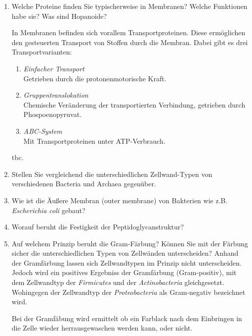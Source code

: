 \begin{enumerate}
		\item Welche Proteine finden Sie typischerweise in Membranen? Welche Funktionen habe sie? Was sind Hopanoide?
			
			In Membranen befinden sich vorallem Transportproteinen.
			Diese ermöglichen den gesteuerten Transport von Stoffen durch die Membran.
			Dabei gibt es drei Transportvarianten:
			\begin{enumerate}[label=\arabic*)]
				\item \emph{Einfacher Transport} \hfill \\ 
					Getrieben durch die protonenmotorische Kraft.
				\item \emph{Gruppentranslokation} \hfill \\ 
					Chemische Veränderung der transportierten Verbindung,
					getrieben durch Phospoenopyruvat.
				\item \emph{ABC-System} \hfill \\ 
					Mit Transportproteinen unter ATP-Verbrauch.
			\end{enumerate}

			tbc.

		\item Stellen Sie vergleichend die unterschiedlichen Zellwand-Typen von verschiedenen Bacteria und Archaea gegenüber.
		\item Wie ist die Äußere Membran (outer membrane) von Bakterien wie z.B. \emph{Escherichia coli} gebaut?
		\item Worauf beruht die Festigkeit der Peptidoglycanstruktur? 
		\item Auf welchem Prinzip beruht die Gram-Färbung? Können Sie mit der Färbung sicher die unterschiedlichen Typen von Zellwänden unterscheiden?
			Anhand der Gramfärbung lassen sich Zellwandtypen im Prinzip nicht unterscheiden.
			Jedoch wird ein positives Ergebniss der Gramfärbung (Gram-positiv),
			mit dem Zellwandtyp der \emph{Firmicutes} und der \emph{Actinobacteria} gleichgesetzt.
			Wohingegen der Zellwandtyp der \emph{Proteobacteria} als Gram-negativ bezeichnet wird.

			Bei der Gramfäbung wird ermittelt ob ein Farblack nach dem Einbringen in die Zelle wieder herrausgewaschen werden kann,
			oder nicht.
	\end{enumerate}

